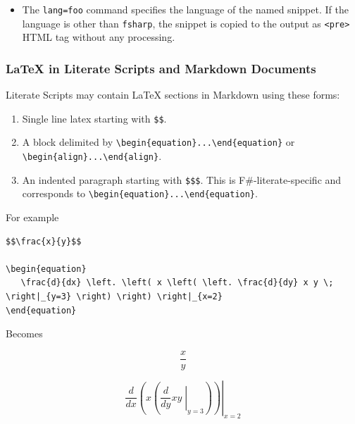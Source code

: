 \documentclass{article}
\begin{document}
\begin{itemize}
\item The \texttt{lang=foo} command specifies the language of the named snippet. If the language
is other than \texttt{fsharp}, the snippet is copied to the output as \texttt{<pre>} HTML
tag without any processing.

\end{itemize}

\subsubsection*{LaTeX in Literate Scripts and Markdown Documents}



Literate Scripts may contain LaTeX sections in Markdown using these forms:
\begin{enumerate}
\item 

Single line latex starting with \texttt{\$\$}.

\item 

A block delimited by \texttt{{\textbackslash}begin\{equation\}...{\textbackslash}end\{equation\}} or \texttt{{\textbackslash}begin\{align\}...{\textbackslash}end\{align\}}.

\item 

An indented paragraph starting with \texttt{\$\$\$}.  This is F\#-literate-specific and corresponds to
\texttt{{\textbackslash}begin\{equation\}...{\textbackslash}end\{equation\}}.

\end{enumerate}



For example
\begin{lstlisting}
$$\frac{x}{y}$$

\begin{equation}
   \frac{d}{dx} \left. \left( x \left( \left. \frac{d}{dy} x y \; \right|_{y=3} \right) \right) \right|_{x=2}
\end{equation}

\end{lstlisting}


Becomes


\begin{equation}
\frac{x}{y}
\end{equation}




\begin{equation}
   \frac{d}{dx} \left. \left( x \left( \left. \frac{d}{dy} x y \; \right|_{y=3} \right) \right) \right|_{x=2}
\end{equation}
\end{document}
